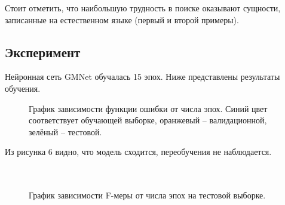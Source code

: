 \documentclass[12pt, a4paper]{article} %
\begin{document}
Стоит отметить, что наибольшую трудность в поиске оказывают сущности, записанные на естественном языке (первый и второй примеры).
\subsection{Эксперимент}
Нейронная сеть GMNet обучалась 15 эпох. Ниже представлены результаты обучения.

\begin{figure}[h]
	\caption{График зависимости функции ошибки от числа эпох. Синий цвет соответствует обучающей выборке, оранжевый -- валидационной, зелёный -- тестовой.}
	\label{ris:image7}
\end{figure}

Из рисунка 6 видно, что модель сходится, переобучения не наблюдается.
\\
\\
\\

\begin{figure}[h]
	\caption{График зависимости F-меры от числа эпох на тестовой выборке.}
	\label{ris:image6}
\end{figure}
\end{document}
